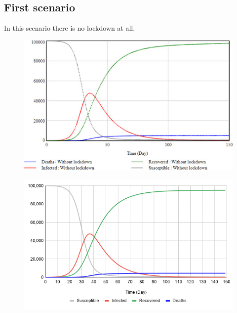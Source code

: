 \documentclass[12pt,a4paper,english]{article}
\begin{document}
    \subsection{First scenario}
    \label{first_scen}
    In this scenario there is no lockdown at all.
    \begin{figure}[h!]
        \centering
        \begin{minipage}{.5\textwidth}
            \centering
            \includegraphics[scale=0.65]{without-lockdown.jpg}
            \label{fig:test1}
        \end{minipage}%
        \begin{minipage}{.5\textwidth}
            \centering
            \includegraphics[scale=0.45]{chart.png}
            \label{fig:test2}
        \end{minipage}
    \end{figure}
\end{document}
